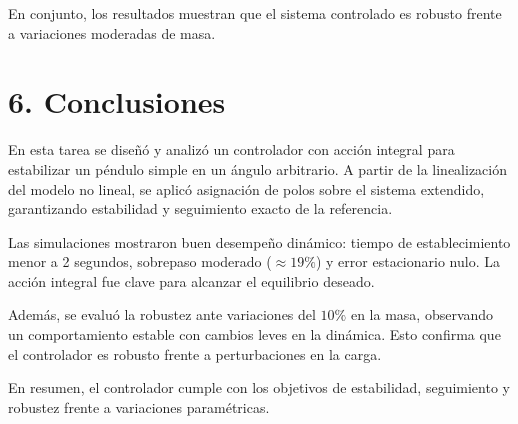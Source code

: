 \documentclass[11pt]{article}
\begin{document}
En conjunto, los resultados muestran que el sistema controlado es robusto frente a variaciones moderadas de masa.

\section*{6. Conclusiones}

En esta tarea se diseñó y analizó un controlador con acción integral para estabilizar un péndulo simple en un ángulo arbitrario. A partir de la linealización del modelo no lineal, se aplicó asignación de polos sobre el sistema extendido, garantizando estabilidad y seguimiento exacto de la referencia.

Las simulaciones mostraron buen desempeño dinámico: tiempo de establecimiento menor a 2 segundos, sobrepaso moderado ($\approx 19\%$) y error estacionario nulo. La acción integral fue clave para alcanzar el equilibrio deseado.

Además, se evaluó la robustez ante variaciones del $10\%$ en la masa, observando un comportamiento estable con cambios leves en la dinámica. Esto confirma que el controlador es robusto frente a perturbaciones en la carga.

En resumen, el controlador cumple con los objetivos de estabilidad, seguimiento y robustez frente a variaciones paramétricas.
\end{document}

